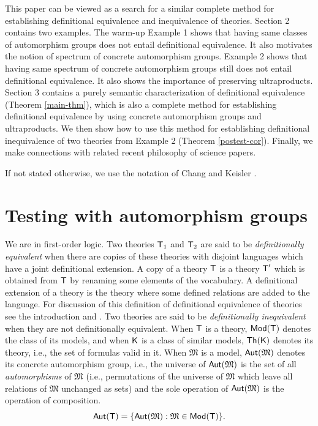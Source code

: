 \documentclass[12pt,leqno]{article}
\newcommand{\Mm}{\mbox{$\mathfrak M$}}
\newcommand{\Aut}{\mbox{\sf Aut}}
\newcommand{\Th}{\mbox{\sf Th}}
\newcommand{\T}{\mbox{\sf T}}
\newcommand{\K}{\mbox{\sf K}}
\newcommand{\Mod}{\mbox{\sf Mod}}
\begin{document}
This paper can be viewed as a search for a similar complete method for establishing definitional equivalence and inequivalence of theories.  Section 2 contains two examples. The warm-up Example 1 shows that having same classes of automorphism groups does not entail definitional equivalence. It also motivates the notion of spectrum of concrete automorphism groups. Example 2 shows that having same spectrum of concrete automorphism groups still does not entail definitional equivalence. It also shows the importance of preserving ultraproducts. Section 3 contains a purely semantic characterization of definitional equivalence (Theorem \ref{main-thm}), which is also a complete method for establishing definitional equivalence by using concrete automorphism groups and ultraproducts. We then show how to use this method for establishing definitional inequivalence of two theories from Example 2 (Theorem \ref{postest-cor}). Finally, we make connections with related recent philosophy of science papers.

If not stated otherwise, we use the notation of Chang and Keisler \cite{CK}.




\section{Testing with automorphism groups}

We are in first-order logic. Two theories $\T_1$ and $\T_2$ are
said to be \emph{definitionally equivalent} when there are copies of
these theories with disjoint languages which have a joint
definitional extension. A copy of a theory $\T$ is a theory $\T'$
which is obtained from $\T$ by renaming some elements of the
vocabulary. A definitional extension of a theory is the theory where
some defined relations are added to the language. For discussion of this definition of 
definitional equivalence of theories see
the introduction and \cite[Definitions 10, 19, Theorem 4]{LSz}.
Two theories are said to be \emph{definitionally inequivalent} when they are not definitionally equivalent.
When $\T$ is a theory, $\Mod(\T)$ denotes the class of its models,
and when $\K$ is a class of similar models, $\Th(\K)$ denotes its
theory, i.e., the set of formulas valid in it. When $\Mm$ is a
model, $\Aut(\Mm)$ denotes its concrete automorphism group, i.e.,
the universe of $\Aut(\Mm)$ is the set of all \emph{automorphisms}
of $\Mm$ (i.e., permutations of the universe of $\Mm$ which leave
all relations of $\Mm$ unchanged as sets) and the sole operation of $\Aut(\Mm)$ is
the operation of composition.
\[ \Aut(\T) = \{\Aut(\Mm) : \Mm\in\Mod(\T)\}.\]
\end{document}
